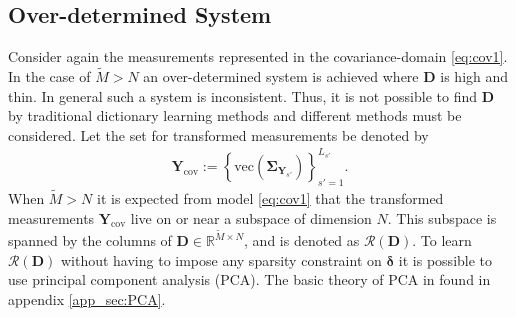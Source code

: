 \subsection{Over-determined System}\label{sec:over_det}
Consider again the measurements represented in the covariance-domain \eqref{eq:cov1}.
In the case of $\widetilde{M} > N$ an over-determined system is achieved where $\mathbf{D}$ is high and thin. 
In general such a system is inconsistent. 
Thus, it is not possible to find $\mathbf{D}$ by traditional dictionary learning methods and different methods must be considered.
Let the set for transformed measurements be denoted by 
\begin{align*}
\mathbf{Y}_{\text{cov}} := \left\{\text{vec}\left( \widehat{\boldsymbol{\Sigma}}_{\mathbf{Y}_{s'}} \right) \right\}_{s' = 1}^{L_{s'}}.
\end{align*}
When $\widetilde{M} > N $ it is expected from model \eqref{eq:cov1} that the transformed measurements $\mathbf{Y}_{\text{cov}}$ live on or near a subspace of dimension $N$. 
This subspace is spanned by the columns of $\mathbf{D} \in \mathbb{R}^{\widetilde{M} \times N}$, and is denoted as $\mathcal{R}(\mathbf{D})$. 
To learn $\mathcal{R}(\mathbf{D})$ without having to impose any sparsity constraint on $\boldsymbol{\delta}$ it is possible to use principal component analysis (PCA). The basic theory of PCA in found in appendix \ref{app_sec:PCA}. 

